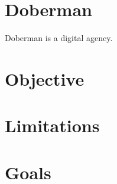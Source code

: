 




\section{Doberman}
Doberman is a digital agency.

\section{Objective}

\section{Limitations}

\section{Goals}
